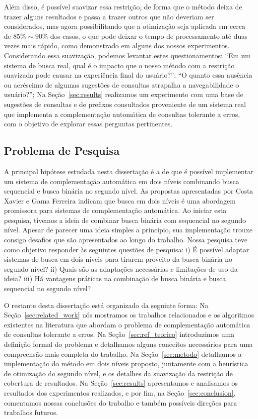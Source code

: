 Além disso, é possível suavizar essa restrição, de forma que o método deixa de trazer alguns resultados e passa a trazer outros que não deveriam ser considerados, mas agora possibilitando que a otimização seja aplicada em cerca de $85\%\sim90\%$ dos casos, o que pode deixar o tempo de processamento até duas vezes mais rápido, como demonstrado em alguns dos nossos experimentos. Considerando essa suavização, podemos levantar estes questionamentos: ``Em um sistema de busca real, qual é o impacto que o nosso método com a restrição suavizada pode causar na experiência final do usuário?''; ``O quanto essa ausência ou acréscimo de algumas sugestões de consultas atrapalha a navegabilidade o usuário?''; Na Seção~\ref{sec:results} realizamos um experimento com uma base de sugestões de consultas e de prefixos consultados proveniente de um sistema real que implementa a complementação automática de consultas tolerante a erros, com o objetivo de explorar essas perguntas pertinentes.

\subsection{Problema de Pesquisa}

A principal hipótese estudada nesta dissertação é a de que é possível implementar um sistema de complementação automática em dois níveis combinando busca sequencial e busca binária no segundo nível. As propostas apresentadas por Costa Xavier e Gama Ferreira indicam que busca em dois níveis é uma abordagem promissora para sistemas de complementação automática. Ao iniciar esta pesquisa, tivemos a ideia de combinar busca binária com sequencial no segundo nível. Apesar de parecer uma ideia simples a princípio, sua implementação trouxe consigo desafios que são apresentados ao longo do trabalho. Nossa pesquisa teve como objetivo responder às seguintes questões de pesquisa: i) É possível adaptar sistemas de busca em dois níveis para tirarem proveito da busca binária no segundo nível? ii) Quais são as adaptações necessárias e limitações de uso da ideia? iii) Há vantagens práticas na combinação de busca binária e busca sequencial no segundo nível?


O restante desta dissertação está organizado da seguinte forma: Na Seção~\ref{sec:related_work} nós mostramos os trabalhos relacionados e os algoritmos existentes na literatura que abordam o problema de complementação automática de consultas tolerante a erros. Na Seção~\ref{sec:ref_teorico} introduzimos uma definição formal do problema e detalhamos alguns conceitos necessários para uma compreensão mais completa do trabalho. Na Seção~\ref{sec:metodo} detalhamos a implementação do método em dois níveis proposto, juntamente com a heurística de otimização do segundo nível, e os detalhes da suavização da restrição de cobertura de resultados. Na Seção~\ref{sec:results} apresentamos e analisamos os resultados dos experimentos realizados, e por fim, na Seção~\ref{sec:conclusion}, comentamos nossas conclusões do trabalho e também possíveis direções para trabalhos futuros.
